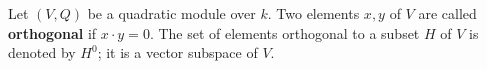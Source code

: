 Let $(V,Q)$ be a quadratic module over $k$. Two elements $x,y$ of $V$ are called \textbf{orthogonal} if $x \cdot y = 0$. The set of elements orthogonal to a subset $H$ of $V$ is denoted by $H^0$; it is a vector subspace of $V$.
